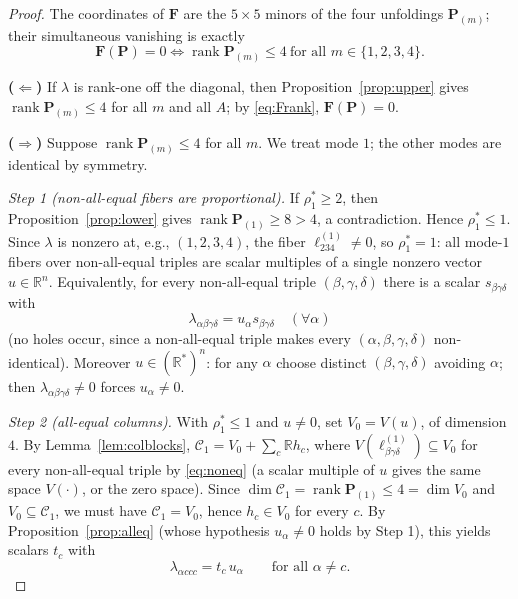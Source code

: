 \documentclass[12pt]{article}
\DeclareMathOperator{\rank}{rank}
\newcommand{\bR}{\mathbb{R}}
\theoremstyle{definition}
\begin{document}
\begin{proof}
The coordinates of $\mathbf F$ are the $5\times5$ minors of the four unfoldings
$\mathbf P_{(m)}$; their simultaneous vanishing is exactly
\begin{equation}\label{eq:Frank}
\mathbf F(\mathbf P)=0\iff\rank\mathbf P_{(m)}\le4\ \text{for all }m\in\{1,2,3,4\}.
\end{equation}

\textbf{($\Leftarrow$)}  If $\lambda$ is rank-one off the diagonal, then
Proposition~\ref{prop:upper} gives $\rank\mathbf P_{(m)}\le4$ for all $m$ and all
$A$; by \eqref{eq:Frank}, $\mathbf F(\mathbf P)=0$.

\textbf{($\Rightarrow$)}  Suppose $\rank\mathbf P_{(m)}\le4$ for all $m$.  We treat
mode $1$; the other modes are identical by symmetry.

\emph{Step 1 (non-all-equal fibers are proportional).}  If $\rho_1^\ast\ge2$, then
Proposition~\ref{prop:lower} gives $\rank\mathbf P_{(1)}\ge8>4$, a contradiction.
Hence $\rho_1^\ast\le1$.  Since $\lambda$ is nonzero at, e.g., $(1,2,3,4)$, the
fiber $\ell^{(1)}_{234}\ne0$, so $\rho_1^\ast=1$: all mode-$1$ fibers over
non-all-equal triples are scalar multiples of a single nonzero vector $u\in\bR^n$.
Equivalently, for every non-all-equal triple $(\beta,\gamma,\delta)$ there is a
scalar $s_{\beta\gamma\delta}$ with
\begin{equation}\label{eq:noneq}
\lambda_{\alpha\beta\gamma\delta}=u_\alpha s_{\beta\gamma\delta}\quad(\forall\alpha)
\end{equation}
(no holes occur, since a non-all-equal triple makes every
$(\alpha,\beta,\gamma,\delta)$ non-identical).  Moreover $u\in(\bR^*)^n$: for any
$\alpha$ choose distinct $(\beta,\gamma,\delta)$ avoiding $\alpha$; then
$\lambda_{\alpha\beta\gamma\delta}\ne0$ forces $u_\alpha\ne0$.

\emph{Step 2 (all-equal columns).}  With $\rho_1^\ast\le1$ and $u\neq0$, set
$V_0=V(u)$, of dimension $4$.  By Lemma~\ref{lem:colblocks},
$\mathcal C_1=V_0+\sum_c\bR h_c$, where $V(\ell^{(1)}_{\beta\gamma\delta})\subseteq
V_0$ for every non-all-equal triple by \eqref{eq:noneq} (a scalar multiple of $u$
gives the same space $V(\cdot)$, or the zero space).  Since
$\dim\mathcal C_1=\rank\mathbf P_{(1)}\le4=\dim V_0$ and $V_0\subseteq\mathcal C_1$,
we must have $\mathcal C_1=V_0$, hence $h_c\in V_0$ for every $c$.  By
Proposition~\ref{prop:alleq} (whose hypothesis $u_\alpha\ne0$ holds by Step 1), this
yields scalars $t_c$ with
\begin{equation}\label{eq:neardiag}
\lambda_{\alpha ccc}=t_c\,u_\alpha\qquad\text{for all }\alpha\ne c .
\end{equation}


\end{proof}
\end{document}
